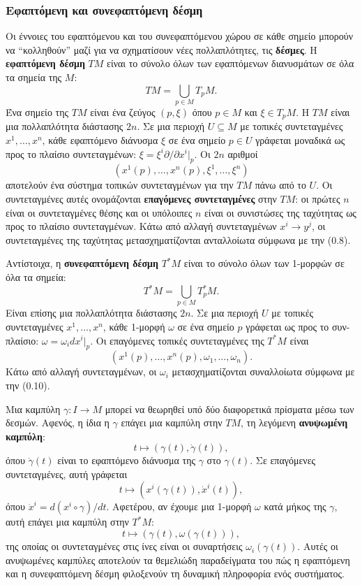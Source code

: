 \documentclass[12pt]{article}
\begin{document}
\subsubsection{Εφαπτόμενη και συνεφαπτόμενη δέσμη}

Οι έννοιες του εφαπτόμενου και του συνεφαπτόμενου χώρου σε κάθε σημείο μπορούν να ``κολληθούν'' μαζί για να σχηματίσουν νέες πολλαπλότητες, τις \textbf{δέσμες}. Η \textbf{εφαπτόμενη δέσμη} $TM$ είναι το σύνολο όλων των εφαπτόμενων διανυσμάτων σε όλα τα σημεία της $M$:
\[
TM = \bigcup_{p \in M} T_pM.
\]
Ένα σημείο της $TM$ είναι ένα ζεύγος $(p, \xi)$ όπου $p \in M$ και $\xi \in T_pM$. Η $TM$ είναι μια πολλαπλότητα διάστασης $2n$. Σε μια περιοχή $U \subseteq M$ με τοπικές συντεταγμένες $x^1, \dots, x^n$, κάθε εφαπτόμενο διάνυσμα $\xi$ σε ένα σημείο $p \in U$ γράφεται μοναδικά ως προς το πλαίσιο συντεταγμένων: $\xi = \xi^i \partial / \partial x^i|_p$. Οι $2n$ αριθμοί
\[
(x^1(p), \dots, x^n(p), \xi^1, \dots, \xi^n)
\]
αποτελούν ένα σύστημα τοπικών συντεταγμένων για την $TM$ πάνω από το $U$. Οι συντεταγμένες αυτές ονομάζονται \textbf{επαγόμενες συντεταγμένες} στην $TM$: οι πρώτες $n$ είναι οι συντεταγμένες θέσης και οι υπόλοιπες $n$ είναι οι συνιστώσες της ταχύτητας ως προς το πλαίσιο συντεταγμένων. Κάτω από αλλαγή συντεταγμένων $x^i \to y^j$, οι συντεταγμένες της ταχύτητας μετασχηματίζονται ανταλλοίωτα σύμφωνα με την (0.8).

Αντίστοιχα, η \textbf{συνεφαπτόμενη δέσμη} $T^*M$ είναι το σύνολο όλων των 1-μορφών σε όλα τα σημεία:
\[
T^*M = \bigcup_{p \in M} T_p^*M.
\]
Είναι επίσης μια πολλαπλότητα διάστασης $2n$. Σε μια περιοχή $U$ με τοπικές συντεταγμένες $x^1, \dots, x^n$, κάθε 1-μορφή $\omega$ σε ένα σημείο $p$ γράφεται ως προς το συν-πλαίσιο: $\omega = \omega_i dx^i|_p$. Οι επαγόμενες τοπικές συντεταγμένες της $T^*M$ είναι
\[
(x^1(p), \dots, x^n(p), \omega_1, \dots, \omega_n).
\]
Κάτω από αλλαγή συντεταγμένων, οι $\omega_i$ μετασχηματίζονται συναλλοίωτα σύμφωνα με την (0.10).

Μια καμπύλη $\gamma: I \to M$ μπορεί να θεωρηθεί υπό δύο διαφορετικά πρίσματα μέσω των δεσμών. Αφενός, η ίδια η $\gamma$ επάγει μια καμπύλη στην $TM$, τη λεγόμενη \textbf{ανυψωμένη καμπύλη}:
\[
t \mapsto (\gamma(t), \dot{\gamma}(t)),
\]
όπου $\dot{\gamma}(t)$ είναι το εφαπτόμενο διάνυσμα της $\gamma$ στο $\gamma(t)$. Σε επαγόμενες συντεταγμένες, αυτή γράφεται
\[
t \mapsto (x^i(\gamma(t)), \dot{x}^i(t)),
\]
όπου $\dot{x}^i = d(x^i \circ \gamma)/dt$. Αφετέρου, αν έχουμε μια 1-μορφή $\omega$ κατά μήκος της $\gamma$, αυτή επάγει μια καμπύλη στην $T^*M$:
\[
t \mapsto (\gamma(t), \omega(\gamma(t))),
\]
της οποίας οι συντεταγμένες στις ίνες είναι οι συναρτήσεις $\omega_i(\gamma(t))$. Αυτές οι ανυψωμένες καμπύλες αποτελούν τα θεμελιώδη παραδείγματα του πώς η εφαπτόμενη και η συνεφαπτόμενη δέσμη φιλοξενούν τη δυναμική πληροφορία ενός συστήματος.
\end{document}
